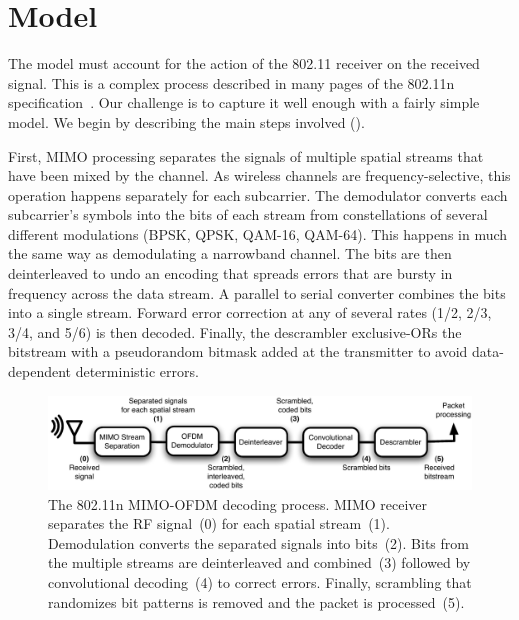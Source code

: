 \ifx\mainfile\undefined

\setcounter{chapter}{3} %
\fi

\cleardoublepage
\chapter{Model}
\label{chap:model}

The model must account for the action of the 802.11 receiver on the received signal. This is a complex process described in many pages of the 802.11n specification~\cite{80211n}. Our challenge is to capture it well enough with a fairly simple model. We begin by describing the main steps involved ().

First, MIMO processing separates the signals of multiple spatial streams that have been mixed by the channel. As wireless channels are frequency-selective, this operation happens separately for each subcarrier. The demodulator converts each subcarrier's symbols into the bits of each stream from constellations of several different modulations (BPSK, QPSK, QAM-16, QAM-64). This happens in much the same way as demodulating a narrowband channel. The bits are then deinterleaved to undo an encoding that spreads errors that are bursty in frequency across the data stream. A parallel to serial converter combines the bits into a single stream. Forward error correction at any of several rates (1/2, 2/3, 3/4, and 5/6) is then decoded. Finally, the descrambler exclusive-ORs the bitstream with a pseudorandom bitmask added at the transmitter to avoid data-dependent deterministic errors.

\begin{figure}[ht!]
\centering
\includegraphics[width=6in]{figures/esnr/mimo_ofdm_decoding_process.pdf}
\caption[The 802.11n MIMO-OFDM decoding process]{\label{fig:ofdm_decoding} The 802.11n MIMO-OFDM decoding process. MIMO receiver separates the RF signal~(0) for each spatial stream~(1). Demodulation converts the separated signals into bits~(2). Bits from the multiple streams are deinterleaved and combined~(3) followed by convolutional decoding~(4) to correct errors. Finally, scrambling that randomizes bit patterns is removed and the packet is processed~(5).}
\end{figure}

